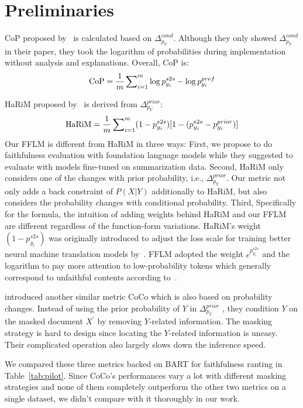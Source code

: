 \newpage

\section{Preliminaries}
\label{sec:appendix-bk}

CoP proposed by~\cite{she2022cop} is calculated based on $\Delta_{p_Y}^{cond}$. Although they only showed $\Delta_{p_Y}^{cond}$ in their paper, they took the logarithm of probabilities during implementation without analysis and explanations. Overall, CoP is:
\begin{equation}
	{\rm CoP} = \frac{1}{m}\sum\nolimits_{i=1}^m \log{p_{y_i}^{s2s}} - \log{p_{y_i}^{pref}}
\end{equation}

HaRiM proposed by~\cite{son2022harim} is derived from $\Delta_{p_Y}^{prior}$:
\begin{equation}
	{\rm HaRiM} = \frac{1}{m}\sum\nolimits_{i=1}^m (1-p_{y_i}^{s2s})[1-({p_{y_i}^{s2s}} - {p_{y_i}^{prior}})]
\end{equation}
Our FFLM is different from HaRiM in three ways: First, we propose to do faithfulness evaluation with foundation language models while they suggested to evaluate with models fine-tuned on summarization data. Second, HaRiM only considers one of the changes with prior probability, i.e., $\Delta_{p_Y}^{prior}$. Our metric not only adds a back constraint of $P(X|Y)$ additionally to HaRiM, but also considers the probability changes with conditional probability. Third,  Specifically for the formula, the intuition of adding weights behind HaRiM and our FFLM are different regardless of the function-form variations. HaRiM's weight $(1-p_{y_i}^{s2s})$ was originally introduced to adjust the loss scale for training better neural machine translation models by~\citet{miao2021prevent}. FFLM adopted the weight $e^{p_{y_i}^{s2s}}$ and the logarithm to pay more attention to low-probability tokens which generally correspond to unfaithful contents according to~\cite{goyal2022training}.

\citet{xie2021factual} introduced another similar metric CoCo which is also based on probability changes. Instead of using the prior probability of $Y$ in $\Delta_{p_Y}^{prior}$ , they condition $Y$ on the masked document $X^\prime$ by removing $Y$-related information. The masking strategy is hard to design since locating the $Y$-related information is uneasy. Their complicated operation also largely slows down the inference speed. 

We compared these three metrics backed on BART for faithfulness ranting in Table~\ref{tab:pilot}. Since CoCo's performances vary a lot with different masking strategies and none of them completely outperform the other two metrics on a single dataset, we didn't compare with it thoroughly in our work.

